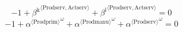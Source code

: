 \begin{equation}
-1 + {\beta^{\mathrm{k}}}^{\langle \mathrm{\mathrm{Prodserv}},\mathrm{\mathrm{Actserv}}\rangle} + {\beta^{\mathrm{l}}}^{\langle \mathrm{\mathrm{Prodserv}},\mathrm{\mathrm{Actserv}}\rangle} = 0
\end{equation}
\begin{equation}
-1 + {{\alpha}^{\langle \mathrm{\mathrm{Prodprim}}\rangle}}^{\omega} + {{\alpha}^{\langle \mathrm{\mathrm{Prodmanu}}\rangle}}^{\omega} + {{\alpha}^{\langle \mathrm{\mathrm{Prodserv}}\rangle}}^{\omega} = 0
\end{equation}





